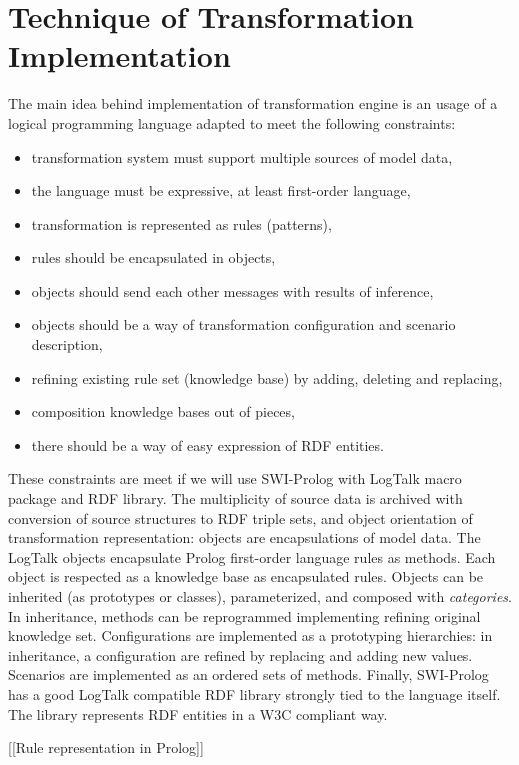 \documentclass[conference]{IEEEtran}
\begin{document}
\section{Technique of Transformation Implementation}
\label{sec:tech-imp}

The main idea behind implementation of transformation engine is an usage of a logical programming language adapted to meet the following constraints:
\begin{itemize}
\item transformation system must support multiple sources of model data,
\item the language must be expressive, at least first-order language,
\item transformation is represented as rules (patterns),
\item rules should be encapsulated in objects,
\item objects should send each other messages with results of inference,
\item objects should be a way of transformation configuration and scenario description,
\item refining existing rule set (knowledge base) by adding, deleting and replacing,
\item composition knowledge bases out of pieces,
\item there should be a way of easy expression of RDF entities.
\end{itemize}

These constraints are meet if we will use SWI-Prolog with LogTalk macro package and RDF library.  The multiplicity of source data is archived with conversion of source structures to RDF triple sets, and object orientation of transformation representation: objects are encapsulations of model data.  The LogTalk objects encapsulate Prolog first-order language rules as methods.  Each object is respected as a knowledge base as encapsulated rules.  Objects can be inherited (as prototypes or classes), parameterized, and composed with \emph{categories}.  In inheritance, methods can be reprogrammed implementing refining original knowledge set.  Configurations are implemented as a prototyping hierarchies: in inheritance, a configuration are refined by replacing and adding new values.  Scenarios are implemented as an ordered sets of methods.  Finally, SWI-Prolog has a good LogTalk compatible RDF library strongly tied to the language itself.  The library represents RDF entities in a W3C compliant way.

[[Rule representation in Prolog]]
\end{document}
